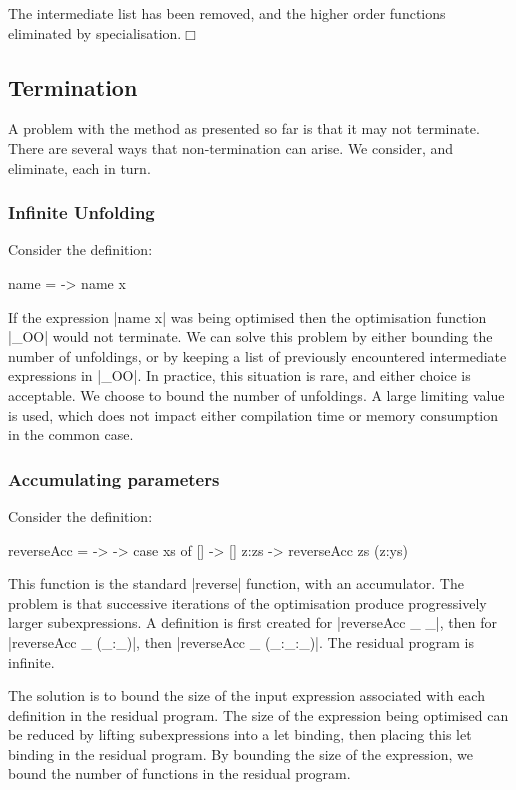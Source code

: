 \documentclass{llncs}
\newcommand{\noexample}{\hfill$\Box$}
\begin{document}
\noindent The intermediate list has been removed, and the higher order functions eliminated by specialisation.\noexample


\subsection{Termination}
\label{sec:termination}

A problem with the method as presented so far is that it may not terminate. There are several ways that non-termination can arise. We consider, and eliminate, each in turn.

\subsubsection{Infinite Unfolding}

Consider the definition:

\begin{code}
name = \x -> name x
\end{code}

If the expression |name x| was being optimised then the optimisation function |_OO| would not terminate. We can solve this problem by either bounding the number of unfoldings, or by keeping a list of previously encountered intermediate expressions in |_OO|. In practice, this situation is rare, and either choice is acceptable. We choose to bound the number of unfoldings. A large limiting value is used, which does not impact either compilation time or memory consumption in the common case.

\subsubsection{Accumulating parameters}

Consider the definition:

\begin{code}
reverseAcc = \xs -> \ys -> case  xs of
                                 []    -> []
                                 z:zs  -> reverseAcc zs (z:ys)
\end{code}

This function is the standard |reverse| function, with an accumulator. The problem is that successive iterations of the optimisation produce progressively larger subexpressions. A definition is first created for |reverseAcc _ _|, then for |reverseAcc _ (_:_)|, then |reverseAcc _ (_:_:_)|. The residual program is infinite.

The solution is to bound the size of the input expression associated with each definition in the residual program. The size of the expression being optimised can be reduced by lifting subexpressions into a let binding, then placing this let binding in the residual program. By bounding the size of the expression, we bound the number of functions in the residual program.
\end{document}
